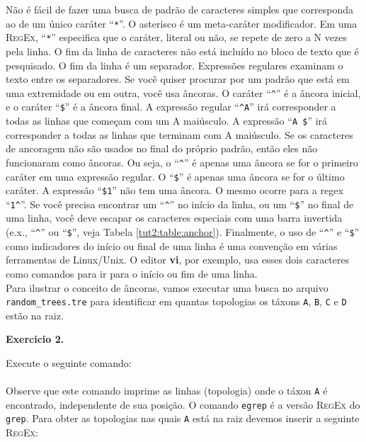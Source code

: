 \begin{refsection}
Não é fácil de fazer uma busca de padrão de caracteres simples que corresponda ao de um único caráter ``\texttt{*}''. O asterisco é um meta-caráter modificador. Em uma \textsc{RegEx}, ``\texttt{*}'' especifica que o caráter, literal ou não, se repete de zero a N vezes pela linha. O fim da linha de caracteres não está incluído no bloco de texto que é pesquisado. O fim da linha é um separador. Expressões regulares examinam o texto entre os separadores. Se você quiser procurar por um padrão que está em uma extremidade ou em outra, você usa âncoras. O caráter ``\texttt{\^{}}'' é a âncora inicial, e o caráter ``\texttt{\$}'' é a âncora final. A expressão regular ``\texttt{\^{}A}'' irá corresponder a todas as linhas que começam com um A maiúsculo. A expressão ``\texttt{A \$}'' irá corresponder a todas as linhas que terminam com A maiúsculo. Se os caracteres de ancoragem não são usados no final do próprio padrão, então eles não funcionaram como âncoras. Ou seja, o ``\texttt{\^{}}'' é apenas uma âncora se for o 
primeiro caráter em uma expressão regular. O ``\texttt{\$}'' é apenas uma âncora se for o último caráter. A expressão ``\texttt{\$1}'' não tem uma âncora. O mesmo ocorre para a regex ``\texttt{1\^{}}''. Se você precisa encontrar um ``\texttt{\^{}}'' no início da linha, ou um ``\texttt{\$}'' no final de uma linha, você deve escapar os caracteres especiais com uma barra invertida (e.x., ``\texttt{\^{}}'' ou ``\texttt{\$}'', veja Tabela \ref{tut2:table:anchor}). Finalmente, o uso de ``\texttt{\^{}}'' e ``\texttt{\$}'' como indicadores do início ou final de uma linha é uma convenção em várias ferramentas de Linux/Unix. O editor \textbf{vi}, por exemplo, usa esses dois caracteres como comandos para ir para o início ou fim de uma linha.\\

Para ilustrar o conceito de âncoras, vamos executar uma busca no arquivo \texttt{random\_trees.tre} para identificar em quantas topologias os táxons \texttt{A}, \texttt{B}, \texttt{C} e \texttt{D} estão na raiz.\\

\begin{blackBlock}{\textbf{Exercicio 2.}}\label{tut2:ex:2.\arabic{ex}}

Execute o seguinte comando:\\
\\

Observe que este comando imprime as linhas (topologia) onde o táxon \texttt{A} é encontrado, independente de sua posição. O comando \texttt{egrep} é a versão \textsc{RegEx} do \texttt{grep}. Para obter as topologias nas quais \texttt{A} está na raiz devemos inserir a seguinte \textsc{RegEx}:\\
\\


\end{blackBlock}
\end{refsection}
